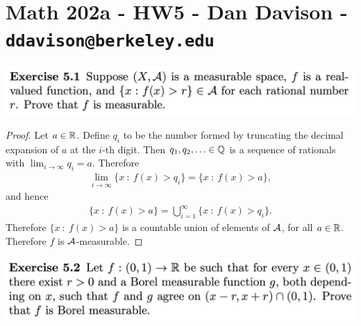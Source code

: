 \section*{Math 202a - HW5 - Dan Davison - \texttt{ddavison@berkeley.edu}}

\begin{mdframed}
\includegraphics[width=400pt]{img/analysis--berkeley-202a-hw06-ab56.png}
\end{mdframed}

\begin{proof}
  Let $a \in \mathbb{R}$. Define $q_i$ to be the number formed by truncating the decimal expansion of $a$ at the $i$-th
  digit. Then $q_1, q_2, \ldots \in \mathbb{Q}$ is a sequence of rationals with $\lim_{i \to \infty} q_i = a$. Therefore
  \begin{align*}
    \lim_{i \to \infty} \{x ~:~ f(x) > q_i\} = \{x ~:~ f(x) > a\},
  \end{align*}
  and hence
  \begin{align*}
    \{x ~:~ f(x) > a\} = \bigcup_{i=1}^\infty \{x ~:~ f(x) > q_i\}.
  \end{align*}
  Therefore $\{x ~:~ f(x) > a\}$ is a countable union of elements of $\mathcal A$, for all $a \in \mathbb{R}$. Therefore $f$
  is $\mathcal A$-measurable.
\end{proof}



\newpage
\begin{mdframed}
\includegraphics[width=400pt]{img/analysis--berkeley-202a-hw06-927a.png}
\end{mdframed}

